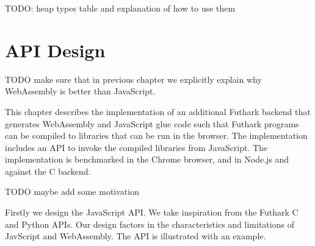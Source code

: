 \documentclass[11pt]{book}
\begin{document}
TODO: heap types table and explanation of how to use them














\chapter{API Design}

TODO make sure that in previous chapter we explicitly explain why WebAssembly is better than JavaScript. 



This chapter describes the implementation of an additional Futhark backend that generates WebAssembly and JavaScript glue code such that Futhark programs can be compiled to libraries that can be run in the browser. The implementation includes an API to invoke the compiled libraries from JavaScript. The implementation is benchmarked in the Chrome browser, and in Node.js and against the C backend.

TODO maybe add some motivation

Firstly we design the JavaScript API. We take inspiration from the Futhark C and Python APIs. Our design factors in the characteristics and limitations of JavScript and WebAssembly. The API is illustrated with an example.
\end{document}
